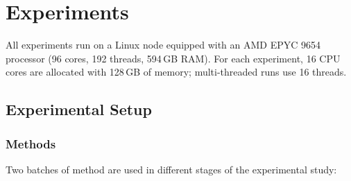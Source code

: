 \section{Experiments}
\label{sec:experi}

All experiments run on a Linux node equipped with an AMD EPYC 9654 processor (96 cores, 192 threads, 594\,GB RAM). For each experiment, 16 CPU cores are allocated with 128\,GB of memory; multi-threaded runs use 16 threads. 

\subsection{Experimental Setup}
\label{sec:setup}

\subsubsection{Methods}
\label{sec:method-list}
Two batches of method are used in different stages of the experimental study: 

